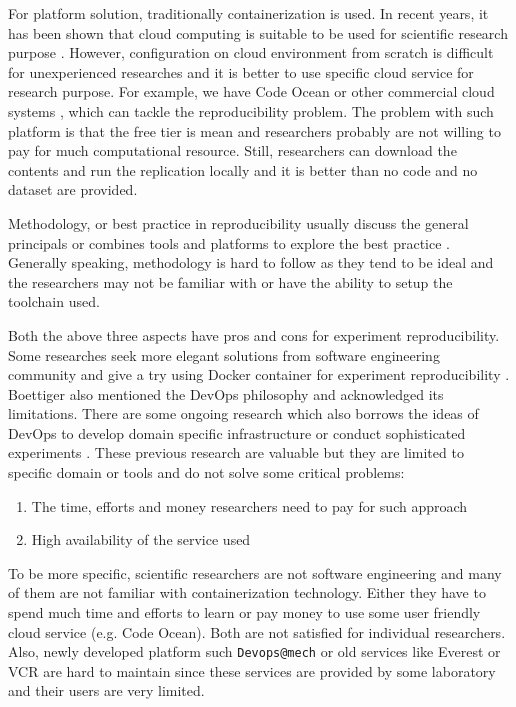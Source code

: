 \documentclass{IEEEcsmag}
\begin{document}
For platform solution, traditionally containerization is used. In recent years, it has been shown that cloud computing is suitable to be used for scientific research purpose \cite{Howe12}. However, configuration on cloud environment from scratch is difficult for unexperienced researches and it is better to use specific cloud service for research purpose. For example, we have Code Ocean or other commercial cloud systems \cite{perkel2018data}, which can tackle the reproducibility problem. The problem with such platform is that the free tier is mean and researchers probably are not willing to pay for much computational resource. Still, researchers can download the contents and run the replication locally and it is better than no code and no dataset are provided.

Methodology, or best practice in reproducibility usually discuss the general principals \cite{stodden2014best} or combines tools and platforms to explore the best practice \cite{QashaCW16}. Generally speaking, methodology is hard to follow as they tend to be ideal and the researchers may not be familiar with or have the ability to setup the toolchain used.  

Both the above three aspects have pros and cons for experiment reproducibility. Some researches seek more elegant solutions from software engineering community and give a try using Docker container for experiment reproducibility \cite{Boettiger15}.
Boettiger also mentioned the DevOps philosophy and acknowledged its limitations.
There are some ongoing research which also borrows the ideas of DevOps to develop domain specific infrastructure \cite{philips2019devops} or conduct sophisticated experiments \cite{chwalisz2019walker}. These previous research are valuable but they are limited to specific domain or tools and do not solve some critical problems:
\begin{enumerate}
\item The time, efforts and money researchers need to pay for such approach
\item High availability of the service used
\end{enumerate}

To be more specific, scientific researchers are not software engineering and many of them are not familiar with containerization technology. Either they have to spend much time and efforts to learn or pay money to use some user friendly 
cloud service (e.g. Code Ocean). Both are not satisfied for individual researchers. Also, newly developed platform such \texttt{Devops@mech} \cite{philips2019devops} or old services like Everest \cite{VOLKOV2017112} or VCR \cite{GavishD12} are hard to maintain since these services are provided by some laboratory and their users are very limited.
\end{document}
